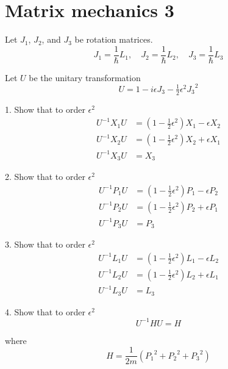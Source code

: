 

\section*{Matrix mechanics 3}

Let $J_1$, $J_2$, and $J_3$ be rotation matrices.
\begin{equation*}
J_1=\frac{1}{\hbar}L_1,\quad
J_2=\frac{1}{\hbar}L_2,\quad
J_3=\frac{1}{\hbar}L_3
\end{equation*}

Let $U$ be the unitary transformation
\begin{equation*}
U=1-i\epsilon J_3-\tfrac{1}{2}\epsilon^2{J_3}^2
\end{equation*}

1. Show that to order $\epsilon^2$
\begin{align*}
U^{-1}X_1U&=\left(1-\tfrac{1}{2}\epsilon^2\right)X_1-\epsilon X_2
\\
U^{-1}X_2U&=\left(1-\tfrac{1}{2}\epsilon^2\right)X_2+\epsilon X_1
\\
U^{-1}X_3U&=X_3
\end{align*}

2. Show that to order $\epsilon^2$
\begin{align*}
U^{-1}P_1U&=\left(1-\tfrac{1}{2}\epsilon^2\right)P_1-\epsilon P_2
\\
U^{-1}P_2U&=\left(1-\tfrac{1}{2}\epsilon^2\right)P_2+\epsilon P_1
\\
U^{-1}P_3U&=P_3
\end{align*}

3. Show that to order $\epsilon^2$
\begin{align*}
U^{-1}L_1U&=\left(1-\tfrac{1}{2}\epsilon^2\right)L_1-\epsilon L_2
\\
U^{-1}L_2U&=\left(1-\tfrac{1}{2}\epsilon^2\right)L_2+\epsilon L_1
\\
U^{-1}L_3U&=L_3
\end{align*}

4. Show that to order $\epsilon^2$
\begin{equation*}
U^{-1}HU=H
\end{equation*}

where
\begin{equation*}
H=\frac{1}{2m}\left({P_1}^2+{P_2}^2+{P_3}^2\right)
\end{equation*}


